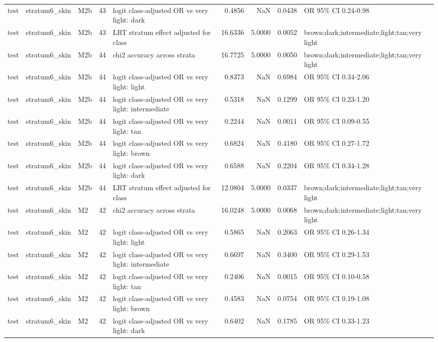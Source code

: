 \begin{tabular}{lllrlrrrl}
test & stratum6\_skin & M2b & 43 & logit class-adjusted OR vs very light: dark & 0.4856 & NaN & 0.0438 & OR 95\% CI 0.24-0.98 \\
test & stratum6\_skin & M2b & 43 & LRT stratum effect adjusted for class & 16.6336 & 5.0000 & 0.0052 & brown;dark;intermediate;light;tan;very light \\
test & stratum6\_skin & M2b & 44 & chi2 accuracy across strata & 16.7725 & 5.0000 & 0.0050 & brown;dark;intermediate;light;tan;very light \\
test & stratum6\_skin & M2b & 44 & logit class-adjusted OR vs very light: light & 0.8373 & NaN & 0.6984 & OR 95\% CI 0.34-2.06 \\
test & stratum6\_skin & M2b & 44 & logit class-adjusted OR vs very light: intermediate & 0.5318 & NaN & 0.1299 & OR 95\% CI 0.23-1.20 \\
test & stratum6\_skin & M2b & 44 & logit class-adjusted OR vs very light: tan & 0.2244 & NaN & 0.0011 & OR 95\% CI 0.09-0.55 \\
test & stratum6\_skin & M2b & 44 & logit class-adjusted OR vs very light: brown & 0.6824 & NaN & 0.4180 & OR 95\% CI 0.27-1.72 \\
test & stratum6\_skin & M2b & 44 & logit class-adjusted OR vs very light: dark & 0.6588 & NaN & 0.2204 & OR 95\% CI 0.34-1.28 \\
test & stratum6\_skin & M2b & 44 & LRT stratum effect adjusted for class & 12.0804 & 5.0000 & 0.0337 & brown;dark;intermediate;light;tan;very light \\
test & stratum6\_skin & M2 & 42 & chi2 accuracy across strata & 16.0248 & 5.0000 & 0.0068 & brown;dark;intermediate;light;tan;very light \\
test & stratum6\_skin & M2 & 42 & logit class-adjusted OR vs very light: light & 0.5865 & NaN & 0.2063 & OR 95\% CI 0.26-1.34 \\
test & stratum6\_skin & M2 & 42 & logit class-adjusted OR vs very light: intermediate & 0.6697 & NaN & 0.3400 & OR 95\% CI 0.29-1.53 \\
test & stratum6\_skin & M2 & 42 & logit class-adjusted OR vs very light: tan & 0.2406 & NaN & 0.0015 & OR 95\% CI 0.10-0.58 \\
test & stratum6\_skin & M2 & 42 & logit class-adjusted OR vs very light: brown & 0.4583 & NaN & 0.0754 & OR 95\% CI 0.19-1.08 \\
test & stratum6\_skin & M2 & 42 & logit class-adjusted OR vs very light: dark & 0.6402 & NaN & 0.1785 & OR 95\% CI 0.33-1.23 \\

\end{tabular}
